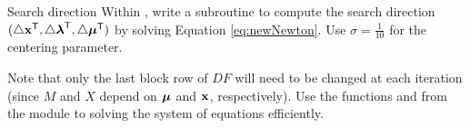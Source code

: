 \begin{problem}{Search direction}{}%
Within , write a subroutine to compute the search direction $(\triangle \mathbf{x}^{\mathsf T} , \triangle \boldsymbol{\lambda}^{\mathsf T} , \triangle \boldsymbol{\mu}^{\mathsf T} )$ by solving Equation \ref{eq:newNewton}.
Use $\sigma = \frac{1}{10}$ for the centering parameter.

Note that only the last block row of $DF$ will need to be changed at each iteration (since $M$ and $X$ depend on $\boldsymbol{\mu}$ and $\mathbf{x}$, respectively).
Use the functions  and  from the  module to solving the system of equations efficiently.
\end{problem}

